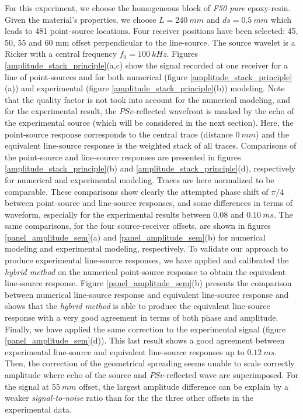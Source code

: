 \documentclass[manuscript,revised]{geophysics}
\begin{document}
\noindent For this experiment, we choose the homogeneous block of \textit{F50 pure} epoxy-resin. Given the material's properties, we choose $L=240\ mm$ and $ds=0.5\ mm$ which leads to 481 point-source locations. Four receiver positions have been selected: 45, 50, 55 and 60 mm offset perpendicular to the line-source. The source wavelet is a Ricker with a central frequency $f_{0}=100\ kHz$. Figures \ref{amplitude_stack_principle}(a,c) show the signal recorded at one receiver for a line of point-sources and for both numerical (figure \ref{amplitude_stack_principle}(a)) and experimental (figure \ref{amplitude_stack_principle}(b)) modeling. Note that the quality factor is not took into account for the numerical modeling, and for the experimental result, the $PSv$-reflected wavefront is masked by the echo of the experimental source (which will be considered in the next section). Here, the point-source response corresponds to the central trace (distance $0\ mm$) and the equivalent line-source response is the weighted stack of all traces. Comparisons of the point-source and line-source responses are presented in figures \ref{amplitude_stack_principle}(b) and \ref{amplitude_stack_principle}(d), respectively for numerical and experimental modeling. Traces are here normalized to be comparable. These comparisons show clearly the attempted phase shift of $\pi/4$ between point-source and line-source responses, and some differences in terms of waveform, especially for the experimental results between $0.08$ and $0.10\ ms$. The same comparisons, for the four source-receiver offsets, are shown in figures \ref{panel_amplitude_sem}(a) and \ref{panel_amplitude_sem}(b) for numerical modeling and experimental modeling, respectively. To validate our approach to produce experimental line-source responses, we have applied and calibrated the \textit{hybrid method} \citep{Forbriger_LSS_2014,Schafer_LSS_2014} on the numerical point-source response to obtain the equivalent line-source response. Figure \ref{panel_amplitude_sem}(b) presents the comparison between numerical line-source response and equivalent line-source response and shows that the \textit{hybrid method} is able to produce the equivalent line-source response with a very good agreement in terms of both phase and amplitude. Finally, we have applied the same correction to the experimental signal (figure \ref{panel_amplitude_sem}(d)). This last result shows a good agreement between experimental line-source and equivalent line-source responses up to $0.12\ ms$. Then, the correction of the geometrical spreading seems unable to scale correctly amplitude where echo of the source and $PSv$-reflected wave are superimposed. For the signal at $55\ mm$ offset, the largest amplitude difference can be explain by a weaker \textit{signal-to-noise} ratio than for the the three other offsets in the experimental data.  
\end{document}
